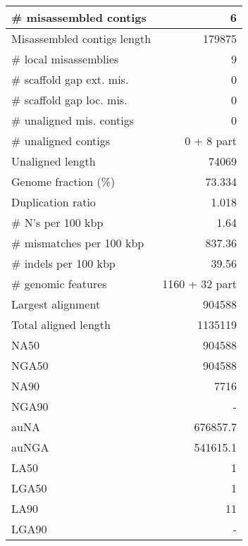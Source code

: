 \documentclass[12pt,a4paper]{article}
\begin{document}
\begin{table}[ht]
\begin{center}
\begin{tabular}{|l*{1}{|r}|}
\# misassembled contigs & 6 \\ \hline
Misassembled contigs length & 179875 \\ \hline
\# local misassemblies & 9 \\ \hline
\# scaffold gap ext. mis. & 0 \\ \hline
\# scaffold gap loc. mis. & 0 \\ \hline
\# unaligned mis. contigs & 0 \\ \hline
\# unaligned contigs & 0 + 8 part \\ \hline
Unaligned length & 74069 \\ \hline
Genome fraction (\%) & 73.334 \\ \hline
Duplication ratio & 1.018 \\ \hline
\# N's per 100 kbp & 1.64 \\ \hline
\# mismatches per 100 kbp & 837.36 \\ \hline
\# indels per 100 kbp & 39.56 \\ \hline
\# genomic features & 1160 + 32 part \\ \hline
Largest alignment & 904588 \\ \hline
Total aligned length & 1135119 \\ \hline
NA50 & 904588 \\ \hline
NGA50 & 904588 \\ \hline
NA90 & 7716 \\ \hline
NGA90 & - \\ \hline
auNA & 676857.7 \\ \hline
auNGA & 541615.1 \\ \hline
LA50 & 1 \\ \hline
LGA50 & 1 \\ \hline
LA90 & 11 \\ \hline
LGA90 & - \\ \hline
\end{tabular}
\end{center}
\end{table}
\end{document}

